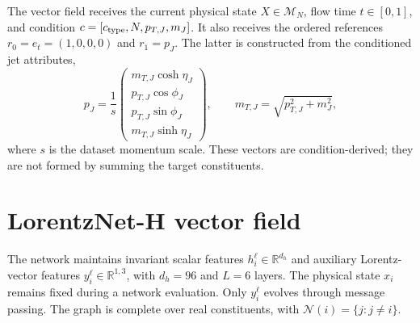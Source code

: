 \documentclass[10pt]{article}
\newcommand{\R}{\mathbb{R}}
\begin{document}
The vector field receives the current physical state $X\in\mathcal{M}_N$, flow
time $t\in[0,1]$, and condition $c=[c_{\rm type},N,p_{T,J},m_J]$. It also receives
the ordered references $r_0=e_t=(1,0,0,0)$ and $r_1=p_J$. The latter is constructed
from the conditioned jet attributes,
\begin{equation}
 p_J=\frac{1}{s}
 \begin{pmatrix}
 m_{T,J}\cosh\eta_J\\
 p_{T,J}\cos\phi_J\\
 p_{T,J}\sin\phi_J\\
 m_{T,J}\sinh\eta_J
 \end{pmatrix},\qquad m_{T,J}=\sqrt{p_{T,J}^2+m_J^2},
 \label{eq:jet-reference}
\end{equation}
where $s$ is the dataset momentum scale. These vectors are condition-derived;
they are not formed by summing the target constituents.

\section{LorentzNet-H vector field}

The network maintains invariant scalar features $h_i^\ell\in\R^{d_h}$ and
auxiliary Lorentz-vector features $y_i^\ell\in\R^{1,3}$, with $d_h=96$ and
$L=6$ layers. The physical state $x_i$ remains fixed during a network evaluation.
Only $y_i^\ell$ evolves through message passing. The graph is complete over real
constituents, with $\mathcal{N}(i)=\{j:j\neq i\}$.
\end{document}
